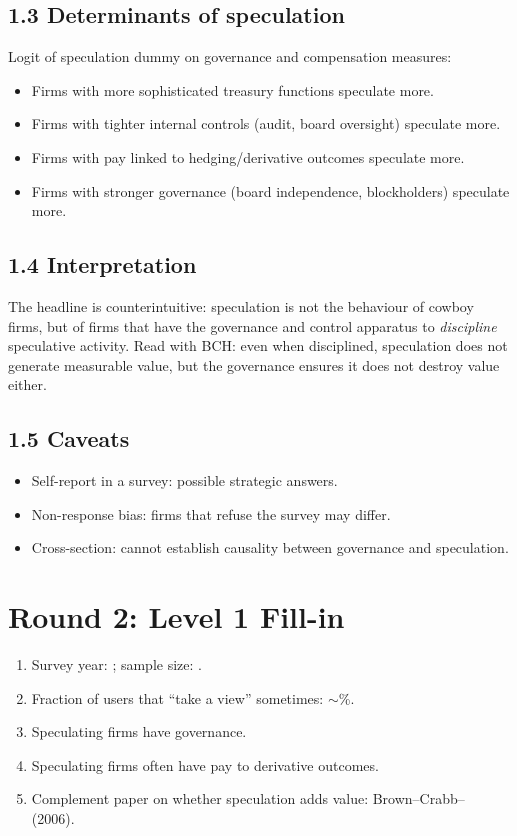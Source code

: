\documentclass[11pt]{article}
\newcommand{\blank}[1]{\underline{\hspace{#1}}}
\begin{document}
\subsection*{1.3 Determinants of speculation}
Logit of speculation dummy on governance and compensation measures:
\begin{itemize}
\item Firms with more sophisticated treasury functions speculate more.
\item Firms with tighter internal controls (audit, board oversight) speculate more.
\item Firms with pay linked to hedging/derivative outcomes speculate more.
\item Firms with stronger governance (board independence, blockholders) speculate more.
\end{itemize}

\subsection*{1.4 Interpretation}
The headline is counterintuitive: speculation is not the behaviour of cowboy firms, but of firms that have the governance and control apparatus to \emph{discipline} speculative activity. Read with BCH: even when disciplined, speculation does not generate measurable value, but the governance ensures it does not destroy value either.

\subsection*{1.5 Caveats}
\begin{alertbox}
\begin{itemize}
\item Self-report in a survey: possible strategic answers.
\item Non-response bias: firms that refuse the survey may differ.
\item Cross-section: cannot establish causality between governance and speculation.
\end{itemize}
\end{alertbox}

\section*{Round 2: Level 1 Fill-in}
\begin{enumerate}
\item Survey year: \blank{1cm}; sample size: \blank{1cm}.
\item Fraction of users that ``take a view'' sometimes: $\sim$\blank{1cm}\%.
\item Speculating firms have \blank{1cm} governance.
\item Speculating firms often have pay \blank{1cm} to derivative outcomes.
\item Complement paper on whether speculation adds value: Brown--Crabb--\blank{2cm} (2006).
\end{enumerate}
\end{document}
